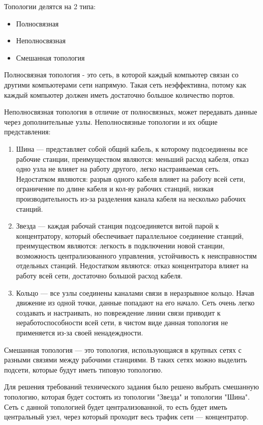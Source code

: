 \documentclass[russian,utf8,pointsection,simple,14pt]{eskdtext}
\begin{document}
\point Топологии делятся на 2 типа:
\begin{itemize}
	\item  Полносвязная
	\item Неполносвязная
	\item Смешанная топология
	
\end{itemize}

Полносвязная топология - это сеть, в которой каждый компьютер связан со другими компьютерами сети напрямую. Такая сеть неэффективна, потому как каждый компьютер должен иметь достаточно большое количество портов.

Неполносвязная топология в отличие от полносвязных, может передавать данные через дополнительные узлы.
\point Неполносвязные топологии и их общие представления:
\begin{enumerate}
	\item Шина --- представляет собой общий кабель, к которому подсоединены все рабочие станции, преимуществом являются: меньший расход кабеля, отказ одно узла не влияет на работу другого, легко настраиваемая сеть. Недостатком являются: разрыв одного кабеля влияет на работу всей сети, ограничение по длине кабеля и кол-ву рабочих станций, низкая производительность из-за разделения канала кабеля на несколько рабочих станций.
	\item Звезда --- каждая рабочай станция подсоединяется витой парой к концентратору, который обеспечивает параллельное соединение станций, преимуществом являются: легкость в подключении новой станции, возможность централизованного управления, устойчивость к неисправностям отдельных станций. Недостатком являются: отказ концентратора влияет на работу всей сети, достаточно большой расход кабеля.
	\item Кольцо --- все узлы соединены каналами связи в неразрывное кольцо. Начав движение из одной точки, данные попадают на его начало. Сеть очень легко создавать и настраивать, но повреждение линии связи приводит к неработоспособности всей сети, в чистом виде данная топология не применяется из-за своей ненадеждности.
\end{enumerate}

Смешанная топология --- это топология, использующаяся в крупных сетях с разными связями между рабочими станциями. В таких сетях можно выделить подсети, которые будут иметь типовую топологию.

Для решения требований технического задания было решено выбрать смешанную топологию, которая будет состоять из топологии "Звезда" и топологии "Шина". Сеть с данной топологией будет централизованной, то есть будет иметь центральный узел, через который проходит весь трафик сети --- концентратор.
\end{document}
